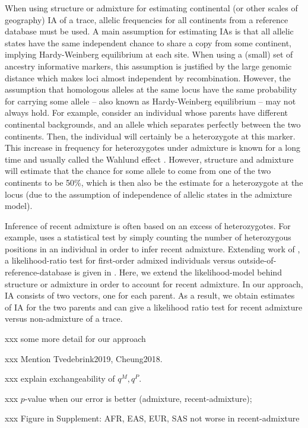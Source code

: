 \documentclass[12pt]{article}
\theoremstyle{definition}
\begin{document}
When using {\sc structure} or {\sc admixture} for estimating
continental (or other scales of geography) IA of a trace, allelic
frequencies for all continents from a reference database must be
used. A main assumption for estimating IAs is that all allelic states
have the same independent chance to share a copy from some continent,
implying Hardy-Weinberg equilibrium at each site. When using a (small)
set of ancestry informative markers, this assumption is justified by
the large genomic distance which makes loci almost independent by
recombination. However, the assumption that homologous alleles at the
same locus have the same probability for carrying some allele -- also
known as Hardy-Weinberg equilibrium -- may not always hold. For
example, consider an individual whose parents have different
continental backgrounds, and an allele which separates perfectly
between the two continents. Then, the individual will certainly be a
heterozygote at this marker.  This increase in frequency for
heterozygotes under admixture is known for a long time and usually
called the Wahlund effect \cite{Wahlund1928}.  However, {\sc
  structure} and {\sc admixture} will estimate that the chance for
some allele to come from one of the two continents to be 50\%, which
is then also be the estimate for a heterozygote at the locus (due to
the assumption of independence of allelic states in the admixture
model).

Inference of recent admixture is often based on an excess of
heterozygotes. For example, \cite{McNevin2019} uses a statistical test
by simply counting the number of heterozygous positions in an
individual in order to infer recent admixture. Extending work of
\cite{Tvedebrink2018a}, a likelihood-ratio test for first-order admixed
individuals versus outside-of-reference-database is given in
\cite{Tvedebrink2019}. Here, we extend the likelihood-model behind
{\sc structure} or {\sc admixture} in order to account for recent
admixture. In our approach, IA consists of two vectors, one for each
parent. As a result, we obtain estimates of IA for the two parents and
can give a likelihood ratio test for recent admixture versus
non-admixture of a trace.

xxx some more detail for our approach

xxx Mention Tvedebrink2019, Cheung2018.

xxx explain exchangeability of $q^M, q^P$.

xxx $p$-value when our error is better (admixture, recent-admixture);

xxx Figure in Supplement: AFR, EAS, EUR, SAS not worse in
recent-admixture
\end{document}
